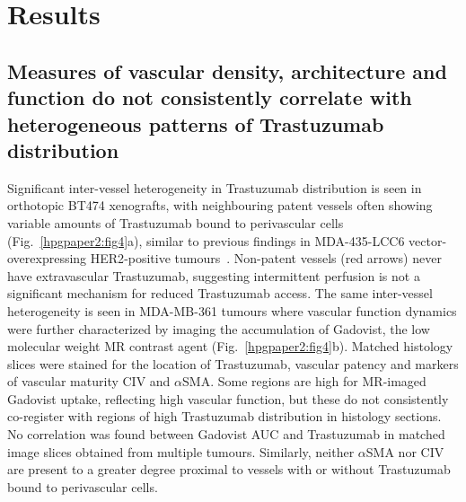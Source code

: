 \section{Results}

\subsection{Measures of vascular density, architecture and function do not consistently correlate with heterogeneous patterns of Trastuzumab distribution}

Significant inter-vessel heterogeneity in Trastuzumab distribution is seen in orthotopic \acs{BT474} xenografts, with neighbouring patent vessels often showing variable amounts of Trastuzumab bound to perivascular cells (Fig.~\ref{hpgpaper2:fig4}a), similar to previous findings in MDA-435-LCC6 vector-overexpressing \acs{HER2}-positive tumours~\cite{Baker:2008ci}.
Non-patent vessels (red arrows) never have extravascular Trastuzumab, suggesting intermittent perfusion is not a significant mechanism for reduced Trastuzumab access.
The same inter-vessel heterogeneity is seen in \acs{MDA-MB-361} tumours where vascular function dynamics were further characterized by imaging the accumulation of Gadovist, the low molecular weight MR contrast agent (Fig.~\ref{hpgpaper2:fig4}b).
Matched histology slices were stained for the location of Trastuzumab, vascular patency and markers of vascular maturity CIV and $\alpha$SMA.
Some regions are high for MR-imaged Gadovist uptake, reflecting high vascular function, but these do not consistently co-register with regions of high Trastuzumab distribution in histology sections.
No correlation was found between Gadovist AUC and Trastuzumab in matched image slices obtained from multiple tumours.
Similarly, neither $\alpha$SMA nor CIV are present to a greater degree proximal to vessels with or without Trastuzumab bound to perivascular cells.

